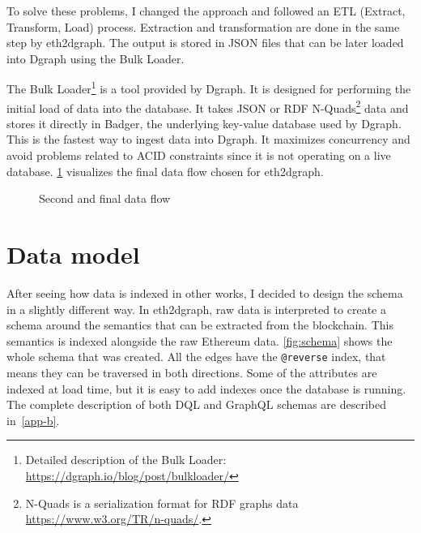 To solve these problems, I changed the approach and followed an ETL (Extract, Transform, Load) process. Extraction and transformation are done in the same step by eth2dgraph. The output is stored in JSON files that can be later loaded into Dgraph using the Bulk Loader.

The Bulk Loader\footnote{Detailed description of the Bulk Loader: \url{https://dgraph.io/blog/post/bulkloader/}} is a tool provided by Dgraph. It is designed for performing the initial load of data into the database. It takes JSON or RDF N-Quads\footnote{N-Quads is a serialization format for RDF graphs data \url{https://www.w3.org/TR/n-quads/}.} data and stores it directly in Badger, the underlying key-value database used by Dgraph. This is the fastest way to ingest data into Dgraph. It maximizes concurrency and avoid problems related to ACID constraints since it is not operating on a live database. \cref{fig:data-flow-2} visualizes the final data flow chosen for eth2dgraph.

\begin{figure}[H]
\centering
{}
\caption[Second and final data flow]{Second and final data flow}
  \label{fig:data-flow-2}
\end{figure}

\section{Data model}

After seeing how data is indexed in other works, I decided to design the schema in a slightly different way. In eth2dgraph, raw data is interpreted to create a schema around the semantics that can be extracted from the blockchain. This semantics is indexed alongside the raw Ethereum data. \cref{fig:schema} shows the whole schema that was created. All the edges have the {\tt @reverse} index, that means they can be traversed in both directions. Some of the attributes are indexed at load time, but it is easy to add indexes once the database is running. The complete description of both DQL and GraphQL schemas are described in~\cref{app-b}.

